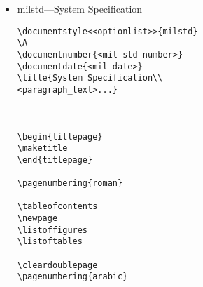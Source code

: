 \begin{itemize}
\begin{small}
\begin{verbatim}
<<pre_commands>>... 
  
\title{<text>} 
\author{<name>} 
\department{<department>} 
\submissiondate{<date>} 
\degree{<degree>} 
\faculty{<faculty>} 
\institution{<institution>} 
\thesis{<thesis>} 
\ded{<dedication>} 
  
 

\maketitle{y}{y}{}  
% 
%You must have the abstract in a file called ABSTRACT.TEX 
% 
\chapter{<text>} 
<text> 
\section{<text>} 
<text> 
\subsection{<text>} 
<text> 
\subsubsection{<text>} 
<text> 
 
\end{verbatim}
\end{small}

\item milstd---System Specification

\begin{small}
\begin{verbatim}
\documentstyle<<optionlist>>{milstd}
\A
\documentnumber{<mil-std-number>}
\documentdate{<mil-date>}
\title{System Specification\\
<paragraph_text>...}



\begin{titlepage}
\maketitle
\end{titlepage}

\pagenumbering{roman}

\tableofcontents
\newpage
\listoffigures
\listoftables

\cleardoublepage
\pagenumbering{arabic}


\end{verbatim}
\end{small}
\end{itemize}
